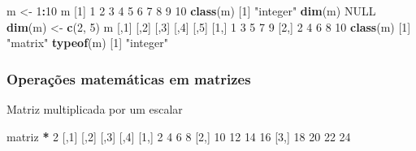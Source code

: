 \documentclass[10pt,a4paper]{book}
\newenvironment{Shaded}{\begin{snugshade}}{\end{snugshade}}
\newcommand{\KeywordTok}[1]{\textcolor[rgb]{0.13,0.29,0.53}{\textbf{#1}}}
\newcommand{\DecValTok}[1]{\textcolor[rgb]{0.00,0.00,0.81}{#1}}
\newcommand{\StringTok}[1]{\textcolor[rgb]{0.31,0.60,0.02}{#1}}
\newcommand{\OtherTok}[1]{\textcolor[rgb]{0.56,0.35,0.01}{#1}}
\newcommand{\OperatorTok}[1]{\textcolor[rgb]{0.81,0.36,0.00}{\textbf{#1}}}
\newcommand{\NormalTok}[1]{#1}
\begin{document}
\begin{Shaded}
\begin{Highlighting}[]
\NormalTok{m <-}\StringTok{ }\DecValTok{1}\OperatorTok{:}\DecValTok{10}
\NormalTok{m}
\NormalTok{ [}\DecValTok{1}\NormalTok{]  }\DecValTok{1}  \DecValTok{2}  \DecValTok{3}  \DecValTok{4}  \DecValTok{5}  \DecValTok{6}  \DecValTok{7}  \DecValTok{8}  \DecValTok{9} \DecValTok{10}
\KeywordTok{class}\NormalTok{(m)}
\NormalTok{[}\DecValTok{1}\NormalTok{] }\StringTok{"integer"}
\KeywordTok{dim}\NormalTok{(m)}
\OtherTok{NULL}
\KeywordTok{dim}\NormalTok{(m) <-}\StringTok{ }\KeywordTok{c}\NormalTok{(}\DecValTok{2}\NormalTok{, }\DecValTok{5}\NormalTok{)}
\NormalTok{m}
\NormalTok{     [,}\DecValTok{1}\NormalTok{] [,}\DecValTok{2}\NormalTok{] [,}\DecValTok{3}\NormalTok{] [,}\DecValTok{4}\NormalTok{] [,}\DecValTok{5}\NormalTok{]}
\NormalTok{[}\DecValTok{1}\NormalTok{,]    }\DecValTok{1}    \DecValTok{3}    \DecValTok{5}    \DecValTok{7}    \DecValTok{9}
\NormalTok{[}\DecValTok{2}\NormalTok{,]    }\DecValTok{2}    \DecValTok{4}    \DecValTok{6}    \DecValTok{8}   \DecValTok{10}
\KeywordTok{class}\NormalTok{(m)}
\NormalTok{[}\DecValTok{1}\NormalTok{] }\StringTok{"matrix"}
\KeywordTok{typeof}\NormalTok{(m)}
\NormalTok{[}\DecValTok{1}\NormalTok{] }\StringTok{"integer"}
\end{Highlighting}
\end{Shaded}

\subsubsection{Operações matemáticas em
matrizes}\label{operacoes-matematicas-em-matrizes}

Matriz multiplicada por um escalar

\begin{Shaded}
\begin{Highlighting}[]
\NormalTok{matriz }\OperatorTok{*}\StringTok{ }\DecValTok{2}
\NormalTok{     [,}\DecValTok{1}\NormalTok{] [,}\DecValTok{2}\NormalTok{] [,}\DecValTok{3}\NormalTok{] [,}\DecValTok{4}\NormalTok{]}
\NormalTok{[}\DecValTok{1}\NormalTok{,]    }\DecValTok{2}    \DecValTok{4}    \DecValTok{6}    \DecValTok{8}
\NormalTok{[}\DecValTok{2}\NormalTok{,]   }\DecValTok{10}   \DecValTok{12}   \DecValTok{14}   \DecValTok{16}
\NormalTok{[}\DecValTok{3}\NormalTok{,]   }\DecValTok{18}   \DecValTok{20}   \DecValTok{22}   \DecValTok{24}
\end{Highlighting}
\end{Shaded}
\end{document}
